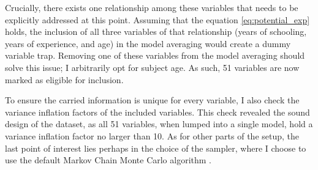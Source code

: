 Crucially, there exists one relationship among these variables that needs to be explicitly addressed at this point. Assuming that the equation \ref{eq:potential_exp} holds, the inclusion of all three variables of that relationship (years of schooling, years of experience, and age) in the model averaging would create a dummy variable trap. Removing one of these variables from the model averaging should solve this issue; I arbitrarily opt for subject age. As such, 51 variables are now marked as eligible for inclusion.

To ensure the carried information is unique for every variable, I also check the variance inflation factors of the included variables. This check revealed the sound design of the dataset, as all 51 variables, when lumped into a single model, hold a variance inflation factor no larger than 10. As for other parts of the setup, the last point of interest lies perhaps in the choice of the sampler, where I choose to use the default Markov Chain Monte Carlo algorithm \citep{zeugner2015bayesian}.


